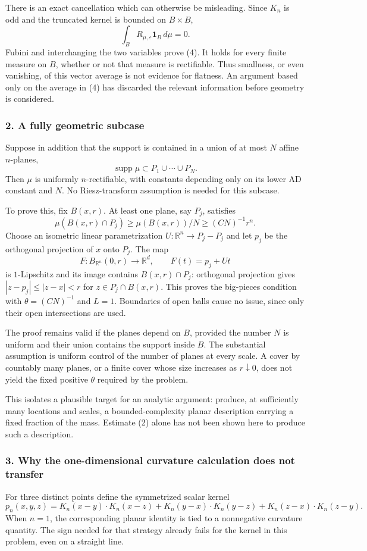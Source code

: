 \documentclass[11pt]{article}
\begin{document}
There is an exact cancellation which can otherwise be misleading. Since $K_n$ is odd and the truncated kernel is bounded on $B\times B$,
\[
 \int_B R_{\mu,\varepsilon}\mathbf1_B\,d\mu=0. \tag{4}
\]
Fubini and interchanging the two variables prove (4). It holds for every finite measure on $B$, whether or not that measure is rectifiable. Thus smallness, or even vanishing, of this vector average is not evidence for flatness. An argument based only on the average in (4) has discarded the relevant information before geometry is considered.

\subsubsection{2. A fully geometric subcase}
Suppose in addition that the support is contained in a union of at most $N$ affine $n$-planes,
\[
 \operatorname{supp}\mu\subset P_1\cup\cdots\cup P_N.
\]
Then $\mu$ is uniformly $n$-rectifiable, with constants depending only on its lower AD constant and $N$. No Riesz-transform assumption is needed for this subcase.

To prove this, fix $B(x,r)$. At least one plane, say $P_j$, satisfies
\[
 \mu(B(x,r)\cap P_j)\geq \mu(B(x,r))/N
 \geq (CN)^{-1}r^n.
\]
Choose an isometric linear parametrization $U:\mathbb R^n\to P_j-P_j$ and let $p_j$ be the orthogonal projection of $x$ onto $P_j$. The map
\[
 F:B_{\mathbb R^n}(0,r)\longrightarrow\mathbb R^d,
 \qquad F(t)=p_j+Ut
\]
is $1$-Lipschitz and its image contains $B(x,r)\cap P_j$: orthogonal projection gives $|z-p_j|\leq |z-x|<r$ for $z\in P_j\cap B(x,r)$. This proves the big-pieces condition with $\theta=(CN)^{-1}$ and $L=1$. Boundaries of open balls cause no issue, since only their open intersections are used.

The proof remains valid if the planes depend on $B$, provided the number $N$ is uniform and their union contains the support inside $B$. The substantial assumption is uniform control of the number of planes at every scale. A cover by countably many planes, or a finite cover whose size increases as $r\downarrow0$, does not yield the fixed positive $\theta$ required by the problem.

This isolates a plausible target for an analytic argument: produce, at sufficiently many locations and scales, a bounded-complexity planar description carrying a fixed fraction of the mass. Estimate (2) alone has not been shown here to produce such a description.

\subsubsection{3. Why the one-dimensional curvature calculation does not transfer}
For three distinct points define the symmetrized scalar kernel
\[
 p_n(x,y,z)=K_n(x-y)\cdot K_n(x-z)
 +K_n(y-x)\cdot K_n(y-z)
 +K_n(z-x)\cdot K_n(z-y).                  \tag{5}
\]
When $n=1$, the corresponding planar identity is tied to a nonnegative curvature quantity. The sign needed for that strategy already fails for the kernel in this problem, even on a straight line.
\end{document}
